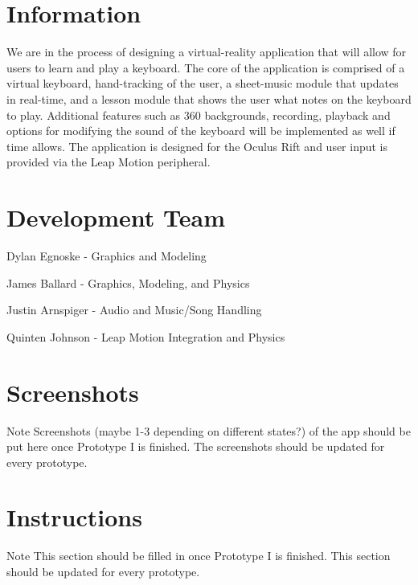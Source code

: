 \hypertarget{index_mainpageinfo}{}\section{Information}\label{index_mainpageinfo}
We are in the process of designing a virtual-\/reality application that will allow for users to learn and play a keyboard. The core of the application is comprised of a virtual keyboard, hand-\/tracking of the user, a sheet-\/music module that updates in real-\/time, and a lesson module that shows the user what notes on the keyboard to play. Additional features such as 360\textdegree{} backgrounds, recording, playback and options for modifying the sound of the keyboard will be implemented as well if time allows. The application is designed for the Oculus Rift and user input is provided via the Leap Motion peripheral.\hypertarget{index_mainpagedevelopers}{}\section{Development Team}\label{index_mainpagedevelopers}
\begin{DoxyItemize}
\item Dylan Egnoske -\/ Graphics and Modeling \item James Ballard -\/ Graphics, Modeling, and Physics \item Justin Arnspiger -\/ Audio and Music/\+Song Handling \item Quinten Johnson -\/ Leap Motion Integration and Physics\end{DoxyItemize}
\hypertarget{index_mainpagescreen}{}\section{Screenshots}\label{index_mainpagescreen}
\begin{DoxyNote}{Note}
Screenshots (maybe 1-\/3 depending on different states?) of the app should be put here once Prototype I is finished. The screenshots should be updated for every prototype.
\end{DoxyNote}
\hypertarget{index_mainpageinstructions}{}\section{Instructions}\label{index_mainpageinstructions}
\begin{DoxyNote}{Note}
This section should be filled in once Prototype I is finished. This section should be updated for every prototype. 
\end{DoxyNote}
